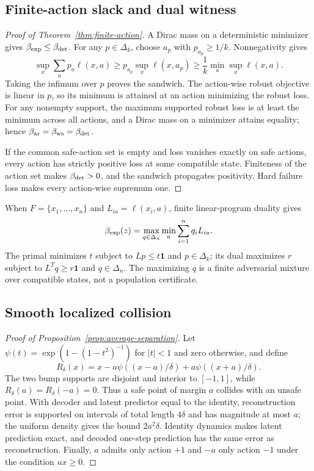 \subsection{Finite-action slack and dual witness}

\begin{proof}[Proof of Theorem~\ref{thm:finite-action}]
A Dirac mass on a deterministic minimizer gives
$\beta_{\rm exp}\leq\beta_{\rm det}$.  For any $p\in\Delta_k$, choose $a_p$ with
$p_{a_p}\geq1/k$.  Nonnegativity gives
\[
 \sup_x\sum_a p_a\ell(x,a)
 \geq p_{a_p}\sup_x\ell(x,a_p)
 \geq\frac1k\min_a\sup_x\ell(x,a).
\]
Taking the infimum over $p$ proves the sandwich.  The action-wise robust objective is linear in
$p$, so its minimum is attained at an action minimizing the robust loss.  For any nonempty support,
the maximum supported robust loss is at least the minimum across all actions, and a Dirac mass on a
minimizer attains equality; hence $\beta_{\rm ar}=\beta_{\rm ws}=\beta_{\rm det}$.

If the common safe-action set is empty and loss vanishes exactly on safe actions, every action has
strictly positive loss at some compatible state.  Finiteness of the action set makes
$\beta_{\rm det}>0$, and the sandwich propagates positivity.  Hard failure loss makes every
action-wise supremum one.
\end{proof}

When $F=\{x_1,\ldots,x_n\}$ and $L_{ia}=\ell(x_i,a)$, finite linear-program duality gives
\[
 \beta_{\rm exp}(z)=\max_{q\in\Delta_n}\min_a\sum_{i=1}^n q_iL_{ia}.
\]
The primal minimizes $t$ subject to $Lp\leq t\mathbf1$ and $p\in\Delta_k$; its dual maximizes $r$
subject to $L^Tq\geq r\mathbf1$ and $q\in\Delta_n$.  The maximizing $q$ is a finite adversarial
mixture over compatible states, not a population certificate.

\subsection{Smooth localized collision}

\begin{proof}[Proof of Proposition~\ref{prop:average-separation}]
Let $\psi(t)=\exp(1-(1-t^2)^{-1})$ for $|t|<1$ and zero otherwise, and define
\[
 R_\delta(x)=x-a\psi((x-a)/\delta)+a\psi((x+a)/\delta).
\]
The two bump supports are disjoint and interior to $[-1,1]$, while
$R_\delta(a)=R_\delta(-a)=0$.  Thus a safe point of margin $a$ collides with an unsafe point.
With decoder and latent predictor equal to the identity, reconstruction error is supported on
intervals of total length $4\delta$ and has magnitude at most $a$; the uniform density gives the
bound $2a^2\delta$.  Identity dynamics makes latent prediction exact, and decoded one-step
prediction has the same error as reconstruction.  Finally, $a$ admits only action $+1$ and $-a$
only action $-1$ under the condition $ux\geq0$.
\end{proof}
